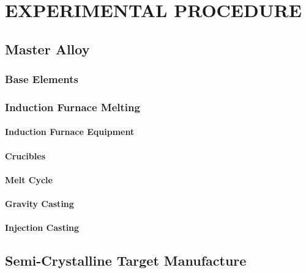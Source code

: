 \documentclass[a4paper,12pt,oneside]{report}%
\begin{document}

\newpage
\tableofcontents\newpage
{}


\chapter{EXPERIMENTAL PROCEDURE}

\section{Master Alloy}
 
\subsection{Base Elements}

\subsection{Induction Furnace Melting}

\subsubsection{Induction Furnace Equipment}

\subsubsection{Crucibles}

\subsubsection{Melt Cycle}

\subsubsection{Gravity Casting}

\subsubsection{Injection Casting}

\section{Semi-Crystalline Target Manufacture} 
\end{document}
